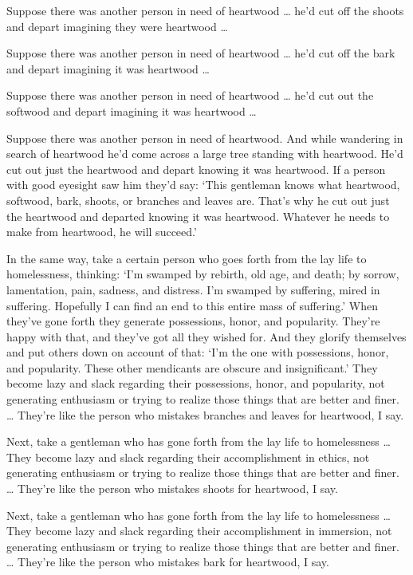 \documentclass[12pt,openany]{book}%
\begin{document}
Suppose there was another person in need of heartwood … he’d cut off the shoots and depart imagining they were heartwood … 

Suppose there was another person in need of heartwood … he’d cut off the bark and depart imagining it was heartwood … 

Suppose there was another person in need of heartwood … he’d cut out the softwood and depart imagining it was heartwood … 

Suppose there was another person in need of heartwood. And while wandering in search of heartwood he’d come across a large tree standing with heartwood. He’d cut out just the heartwood and depart knowing it was heartwood. If a person with good eyesight saw him they’d say: ‘This gentleman knows what heartwood, softwood, bark, shoots, or branches and leaves are. That’s why he cut out just the heartwood and departed knowing it was heartwood. Whatever he needs to make from heartwood, he will succeed.’ 

In the same way, take a certain person who goes forth from the lay life to homelessness, thinking: ‘I’m swamped by rebirth, old age, and death; by sorrow, lamentation, pain, sadness, and distress. I’m swamped by suffering, mired in suffering. Hopefully I can find an end to this entire mass of suffering.’ When they’ve gone forth they generate possessions, honor, and popularity. They’re happy with that, and they’ve got all they wished for. And they glorify themselves and put others down on account of that: ‘I’m the one with possessions, honor, and popularity. These other mendicants are obscure and insignificant.’ They become lazy and slack regarding their possessions, honor, and popularity, not generating enthusiasm or trying to realize those things that are better and finer. … They’re like the person who mistakes branches and leaves for heartwood, I say. 

Next, take a gentleman who has gone forth from the lay life to homelessness … They become lazy and slack regarding their accomplishment in ethics, not generating enthusiasm or trying to realize those things that are better and finer. … They’re like the person who mistakes shoots for heartwood, I say. 

Next, take a gentleman who has gone forth from the lay life to homelessness … They become lazy and slack regarding their accomplishment in immersion, not generating enthusiasm or trying to realize those things that are better and finer. … They’re like the person who mistakes bark for heartwood, I say. 
\end{document}
